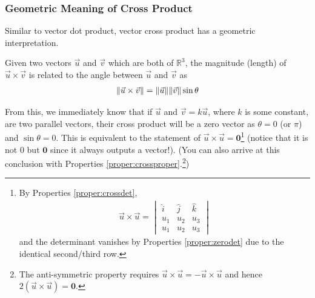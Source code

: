 \subsubsection{Geometric Meaning of Cross Product} Similar to vector dot product, vector cross product has a geometric interpretation.
\begin{proper}
\label{proper:crossgeo}
Given two vectors $\vec{u}$ and $\vec{v}$ which are both of $\mathbb{R}^3$, the magnitude (length) of $\vec{u} \times \vec{v}$ is related to the angle between $\vec{u}$ and $\vec{v}$ as
\begin{align*}
\norm{\vec{u} \times \vec{v}} = \norm{\vec{u}}\norm{\vec{v}}\sin\theta
\end{align*}
\end{proper}
From this, we immediately know that if $\vec{u}$ and $\vec{v} = k\vec{u}$, where $k$ is some constant, are two parallel vectors, their cross product will be a zero vector as $\theta = 0$ (or $\pi$) and $\sin \theta = 0$. This is equivalent to the statement of $\vec{u} \times \vec{u} = \textbf{0}$\footnote{By Properties \ref{proper:crossdet},
\begin{align*}
\vec{u} \times \vec{u} = 
\begin{vmatrix}
\hat{i} & \hat{j} & \hat{k} \\
u_1 & u_2 & u_3 \\
u_1 & u_2 & u_3
\end{vmatrix} 
\end{align*} and the determinant vanishes by Properties \ref{proper:zerodet} due to the identical second/third row.} (notice that it is not $0$ but $\textbf{0}$ since it always outputs a vector!). (You can also arrive at this conclusion with Properties \ref{proper:crossproper}.\footnote{The anti-symmetric property requires $\vec{u}\times\vec{u} = -\vec{u}\times\vec{u}$ and hence $2(\vec{u}\times\vec{u}) = \textbf{0}$.})

